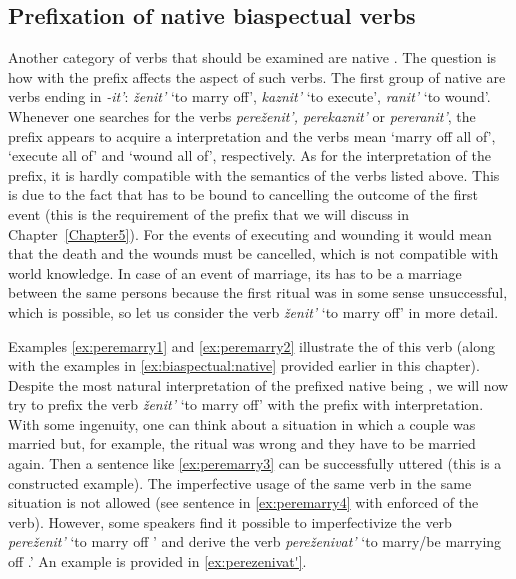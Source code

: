 \subsection{Prefixation of native biaspectual verbs}\label{subsection:perf:native}
Another category of verbs that should be examined are native . The question is how  with the  prefix  affects the aspect of such verbs. The first group of native  are verbs ending in \textit{-it'}: \textit{\v{z}enit'} `to marry off', \textit{kaznit'} `to execute', \textit{ranit'} `to wound'. Whenever one searches for the verbs \textit{pere\v{z}enit', perekaznit'} or \textit{pereranit'}, the prefix  appears to acquire a  interpretation and the verbs mean `marry off all of', `execute all of' and `wound all of', respectively. As for the  interpretation of the prefix, it is hardly compatible with the semantics of the verbs listed above. This is due to the fact that  has to be bound to cancelling the outcome of the first event (this is the requirement of the prefix  that we will discuss in Chapter~\ref{Chapter5}). For the events of executing and wounding it would mean that the death and the wounds must be cancelled, which is not compatible with world knowledge. In case of an event of marriage, its  has to be a marriage between the same persons because the first ritual was in some sense unsuccessful, which is possible, so let us consider the verb \textit{\v{z}enit'} `to marry off' in more detail. 

Examples \ref{ex:peremarry1} and \ref{ex:peremarry2} illustrate the  of this verb (along with the examples in \ref{ex:biaspectual:native} provided earlier in this chapter). Despite the most natural interpretation of the prefixed native  being , we will now try to prefix the verb \textit{\v{z}enit'} `to marry off' with the prefix  with  interpretation. With some ingenuity, one can think about a situation in which a couple was married but, for example, the ritual was wrong and they have to be married again. Then a sentence like \ref{ex:peremarry3} can be successfully uttered (this is a constructed example). The imperfective usage of the same verb in the same situation is not allowed (see sentence in \ref{ex:peremarry4} with enforced  of the verb). However, some speakers find it possible to imperfectivize the verb \textit{pere\v{z}enit'} `to marry off ' and derive the verb \textit{pere\v{z}enivat'} `to marry/be marrying off .' An example is provided in \ref{ex:perezenivat'}. 

